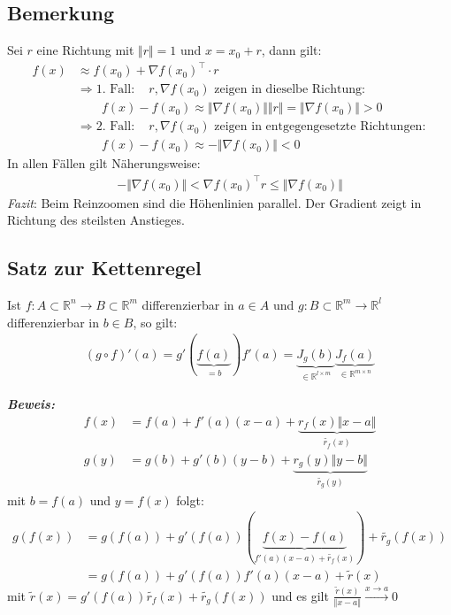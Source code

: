\documentclass[11pt,a4paper]{book}
\newcommand {\R}	{\mathbb{R}}
\newcommand {\Rn}	{\mathbb{R}^n}
\newcommand {\Rm}	{\mathbb{R}^m}
\newcommand{\1}    	{\mathbbm{1}}
\newcommand{\Beweis}[1][Beweis]
{\begin{mdframed}[backgroundcolor=gray!10,linewidth=0pt]\noindent\textit{\textbf{{#1}:}}~}
\newcommand{\QED}	{\end{mdframed}}
\begin{document}
\subsection{Bemerkung}
Sei \(r\) eine Richtung mit \(\Vert r \Vert = 1\) und \(x = x_0 + r\), dann gilt:
\begin{align*}
	f(x) &\approx f(x_0) + \nabla f(x_0)^\top \cdot r \\
	&\Rightarrow \textrm{1. Fall}: \quad r, \nabla f(x_0) \textrm{ zeigen in dieselbe Richtung}: \\
	&\qquad f(x) - f(x_0) \approx \Vert \nabla f(x_0) \Vert \Vert r \Vert = \Vert \nabla f(x_0) \Vert > 0 \\
	&\Rightarrow \textrm{2. Fall}: \quad r, \nabla f(x_0) \textrm{ zeigen in entgegengesetzte Richtungen}: \\
	&\qquad f(x) - f(x_0) \approx - \Vert \nabla f(x_0) \Vert < 0
\end{align*}
In allen Fällen gilt Näherungsweise:
\begin{align*}
	- \Vert \nabla f(x_0) \Vert  < \nabla f(x_0)^\top r \leqslant \Vert \nabla f(x_0) \Vert
\end{align*}
\textit{Fazit}: Beim Reinzoomen sind die Höhenlinien parallel. Der Gradient zeigt in Richtung des steilsten Anstieges.

\subsection{Satz zur Kettenregel}
Ist \(f: A \subset \Rn \rightarrow B \subset \Rm\) differenzierbar in \(a \in A\) und \(g: B \subset \Rm \rightarrow \R^l\) differenzierbar in \(b \in B\), so gilt:
\begin{align*}
	(g \circ f)'(a) = g'\left(\underbrace{f(a)}_{=b}\right) f'(a) = 
	\underbrace{ J_g (b) }_{\in \R^{l \times m}}
	\underbrace{ J_f (a) }_{\in \R^{m \times n}}
\end{align*}

\Beweis
\begin{align*}
	f(x) &= f(a) + f'(a)(x-a) + \underbrace{r_f(x) \Vert x - a \Vert}_{\tilde{r_f}(x)} \\
	g(y) &= g(b) + g'(b)(y-b) + \underbrace{r_g(y) \Vert y - b \Vert}_{\tilde{r_g}(y)}
\end{align*}
mit \(b = f(a)\) und \(y = f(x)\) folgt:
\begin{align*}
	g(f(x)) &= g(f(a)) + g'(f(a)) \left( \underbrace{ f(x) - f(a) }_{f'(a)(x-a) + \tilde{r_f}(x)} \right) + \tilde{r_g}(f(x)) \\
	&= g(f(a)) + g'(f(a))f'(a)(x-a) + \tilde{r}(x)
\end{align*}
mit \(\tilde{r}(x) = g'(f(a))\tilde{r_f}(x) + \tilde{r_g}(f(x))\) und es gilt \(\frac{\tilde{r}(x)}{\Vert x - a\Vert} \stackrel{x \rightarrow a}{\rightarrow} 0\)
\QED
\end{document}
